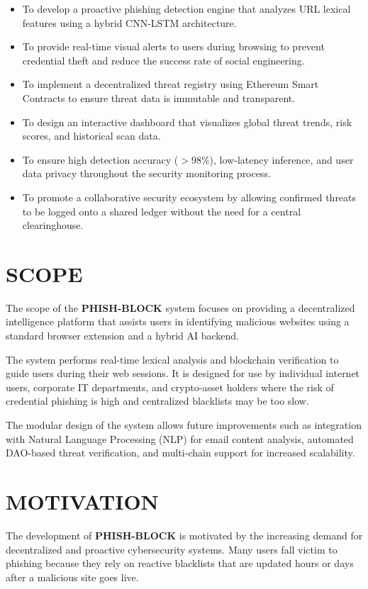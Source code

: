 \begin{itemize}
    \item To develop a proactive phishing detection engine that analyzes URL lexical features using a hybrid CNN-LSTM architecture.
    \item To provide real-time visual alerts to users during browsing to prevent credential theft and reduce the success rate of social engineering.
    \item To implement a decentralized threat registry using Ethereum Smart Contracts to ensure threat data is immutable and transparent.
    \item To design an interactive dashboard that visualizes global threat trends, risk scores, and historical scan data.
    \item To ensure high detection accuracy ($>98\%$), low-latency inference, and user data privacy throughout the security monitoring process.
    \item To promote a collaborative security ecosystem by allowing confirmed threats to be logged onto a shared ledger without the need for a central clearinghouse.
\end{itemize}

\section{SCOPE}

The scope of the \textbf{PHISH-BLOCK} system focuses on providing a decentralized intelligence platform that assists users in identifying malicious websites using a standard browser extension and a hybrid AI backend.

The system performs real-time lexical analysis and blockchain verification to guide users during their web sessions. It is designed for use by individual internet users, corporate IT departments, and crypto-asset holders where the risk of credential phishing is high and centralized blacklists may be too slow.

The modular design of the system allows future improvements such as integration with Natural Language Processing (NLP) for email content analysis, automated DAO-based threat verification, and multi-chain support for increased scalability.

\section{MOTIVATION}

The development of \textbf{PHISH-BLOCK} is motivated by the increasing demand for decentralized and proactive cybersecurity systems. Many users fall victim to phishing because they rely on reactive blacklists that are updated hours or days after a malicious site goes live.

